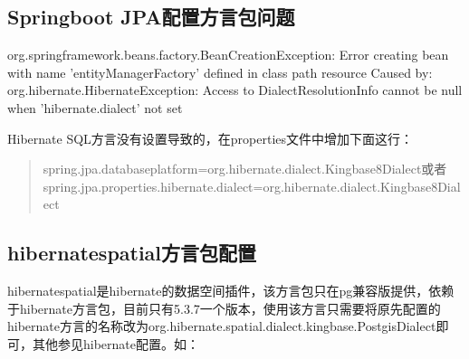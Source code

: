 \documentclass[a4,10pt,oneside,english]{sphinxmanual}
\begin{document}
\begin{sphinxVerbatim}[commandchars=\\\{\}]
     
   
   
\end{sphinxVerbatim}


\subsection{Springboot JPA配置方言包问题}
\label{\detokenize{interface/hibernate:springboot-jpa}}
org.springframework.beans.factory.BeanCreationException: Error creating bean with name 'entityManagerFactory' defined in class path resource
Caused by: org.hibernate.HibernateException: Access to DialectResolutionInfo cannot be null when 'hibernate.dialect' not set

Hibernate SQL方言没有设置导致的，在properties文件中增加下面这行：
\begin{quote}

spring.jpa.database\sphinxhyphen{}platform=org.hibernate.dialect.Kingbase8Dialect或者spring.jpa.properties.hibernate.dialect=org.hibernate.dialect.Kingbase8Dialect
\end{quote}


\subsection{hibernate\sphinxhyphen{}spatial方言包配置}
\label{\detokenize{interface/hibernate:hibernate-spatial}}
hibernate\sphinxhyphen{}spatial是hibernate的数据空间插件，该方言包只在pg兼容版提供，依赖于hibernate方言包，目前只有5.3.7一个版本，使用该方言只需要将原先配置的hibernate方言的名称改为org.hibernate.spatial.dialect.kingbase.PostgisDialect即可，其他参见hibernate配置。如：
\end{document}
